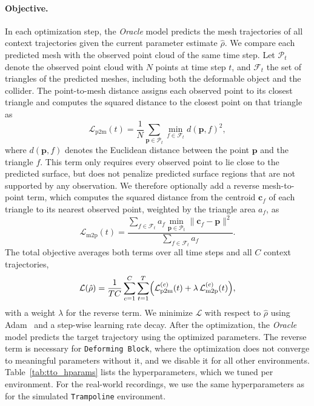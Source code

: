 \paragraph{Objective.}
In each optimization step, the \textit{Oracle} model predicts the mesh trajectories of all context trajectories given the current parameter estimate $\hat{\rho}$. We compare each predicted mesh with the observed point cloud of the same time step. Let $\mathcal{P}_t$ denote the observed point cloud with $N$ points at time step $t$, and $\mathcal{F}_t$ the set of triangles of the predicted meshes, including both the deformable object and the collider. The point-to-mesh distance assigns each observed point to its closest triangle and computes the squared distance to the closest point on that triangle as
\begin{equation*}
    \mathcal{L}_{\text{p2m}}(t) = \frac{1}{N} \sum_{\mathbf{p} \in \mathcal{P}_t} \min_{f \in \mathcal{F}_t} d(\mathbf{p}, f)^2 ,
\end{equation*}
where $d(\mathbf{p}, f)$ denotes the Euclidean distance between the point $\mathbf{p}$ and the triangle $f$.
This term only requires every observed point to lie close to the predicted surface, but does not penalize predicted surface regions that are not supported by any observation. We therefore optionally add a reverse mesh-to-point term, which computes the squared distance from the centroid $\mathbf{c}_f$ of each triangle to its nearest observed point, weighted by the triangle area $a_f$, as
\begin{equation*}
    \mathcal{L}_{\text{m2p}}(t) = \frac{\sum_{f \in \mathcal{F}_t} a_f \min_{\mathbf{p} \in \mathcal{P}_t} \| \mathbf{c}_f - \mathbf{p} \|^2}{\sum_{f \in \mathcal{F}_t} a_f} .
\end{equation*}
The total objective averages both terms over all time steps and all $C$ context trajectories,
\begin{equation*}
    \mathcal{L}(\hat{\rho}) = \frac 1 {TC} \sum_{c=1}^{C} \sum_{t=1}^{T} \Bigl( \mathcal{L}_{\text{p2m}}^{(c)}(t) + \lambda \, \mathcal{L}_{\text{m2p}}^{(c)}(t) \Bigr) ,
\end{equation*}
with a weight $\lambda$ for the reverse term. We minimize $\mathcal{L}$ with respect to $\hat{\rho}$ using Adam~\citep{kingma2014adam} and a step-wise learning rate decay. After the optimization, the \textit{Oracle} model predicts the target trajectory using the optimized parameters. The reverse term is necessary for \texttt{Deforming Block}, where the optimization does not converge to meaningful parameters without it, and we disable it for all other environments. Table~\ref{tab:tto_hparams} lists the hyperparameters, which we tuned per environment. For the real-world recordings, we use the same hyperparameters as for the simulated \texttt{Trampoline} environment.


